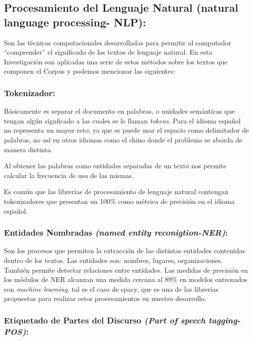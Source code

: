 \documentclass[
  10,
  spanish,
  openany]{book}
\begin{document}
\hypertarget{nlproc}{%
\subsection{Procesamiento del Lenguaje Natural (natural language processing- NLP):}\label{nlproc}}

Son las técnicas computacionales desarrolladas para permitir al computador ``comprender'' el significado de los textos de lenguaje natural. En esta Investigación son aplicadas una serie de estos métodos sobre los textos que componen el Corpus y podemos mencionar las siguientes:

\hypertarget{token}{%
\subsubsection{Tokenizador:}\label{token}}

Básicamente es separar el documento en palabras, o unidades semánticas que tengan algún signficado a las cuales se le llaman \emph{tokens}. Para el idioma español no representa un mayor reto, ya que se puede usar el espacio como delimitador de palabras, no así en otros idiomas como el chino donde el problema se aborda de manera distinta.

Al obtener las palabras como entidades separadas de un texto nos permite calcular la frecuencia de uso de las mismas.

Es común que las librerías de procesamiento de lenguaje natural contengan tokenizadores que presentan un 100\% como métrica de precisión en el idioma español.

\hypertarget{ner}{%
\subsubsection{\texorpdfstring{Entidades Nombradas \emph{(named entity reconigtion-NER)}:}{Entidades Nombradas (named entity reconigtion-NER):}}\label{ner}}

Son los procesos que permiten la extracción de las distintas entidades contenidas dentro de los textos. Las entidades son: nombres, lugares, organizaciones. También permite detectar relaciones entre entidades. Las medidas de precisión en los módulos de NER alcanzan una medida cercana al 89\% en modelos entrenados con \emph{machine learning}, tal es el caso de spacy, que es una de las librerías propuestas para realizar estos procesamientos en nuestro desarrollo.

\hypertarget{pos}{%
\subsubsection{\texorpdfstring{Etiquetado de Partes del Discurso \emph{(Part of speech tagging-POS)}:}{Etiquetado de Partes del Discurso (Part of speech tagging-POS):}}\label{pos}}
\end{document}

